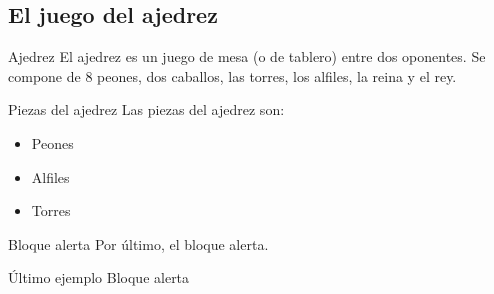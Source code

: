 \documentclass[aspectratio=169]{beamer}
\begin{document}
\subsection{El juego del ajedrez}
\begin{frame}{Ajedrez}
    El ajedrez es un juego de mesa (o de tablero) entre dos oponentes. Se compone de 8 peones, dos caballos, las torres, los alfiles, la reina y el rey.

\begin{exampleblock}{Piezas del ajedrez}
Las piezas del ajedrez son: 
    \begin{itemize}
        \item Peones
        \item Alfiles
        \item Torres
    \end{itemize}
    \end{exampleblock}
\end{frame}


\begin{frame}{Bloque alerta}
    Por último, el bloque alerta.

    \begin{alertblock}{Último ejemplo}
        Bloque alerta
    \end{alertblock}
\end{frame}
\end{document}
